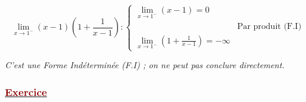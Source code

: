\documentclass[12pt,a4paper]{article}
\begin{document}
\begin{itemize}
    \vspace{0.2cm}
    
    \[
    \lim_{x \to 1^-} (x - 1) \left(1 + \frac{1}{x - 1}\right) :
    \begin{cases}
    \displaystyle \lim_{x \to 1^-} (x - 1) = 0 \\
    & \text{Par produit (F.I)} \\
    \displaystyle \lim_{x \to 1^-} \left(1 + \frac{1}{x - 1}\right) = -\infty
    \end{cases}
    \]
    
    \vspace{0.2cm}
    \textit{C'est une Forme Indéterminée (F.I) ; on ne peut pas conclure directement.}
\end{itemize}

\subsubsection*{\underline{\textcolor{darkred}{ Exercice }}}
\end{document}
